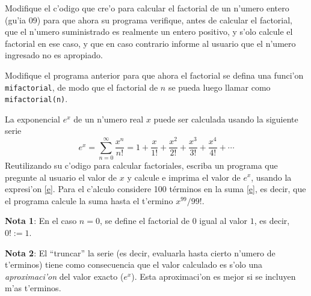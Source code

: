 \documentclass[11pt]{exam}
\begin{document}
\firstpageheadrule
\runningheadrule
{}
\cfoot{ }
\begin{flushleft}
\vspace{0.2in}

\vspace{0.25cm}
\end{flushleft}

\begin{questions}
 
\item Modifique el c'odigo que cre'o para calcular el factorial de un n'umero entero (gu'ia 09) para que ahora su programa verifique, antes de calcular el factorial, que el n'umero suministrado es realmente un entero positivo, y s'olo calcule el factorial en ese caso, y que en caso contrario informe al usuario que el n'umero ingresado no es apropiado.

\item Modifique el programa anterior para que ahora el factorial se defina una funci'on \texttt{mifactorial}, de modo que el factorial de $n$ se pueda luego llamar como \texttt{mifactorial(n)}.

\item La exponencial $e^x$ de un n'umero real $x$ puede ser calculada usando la siguiente serie
\begin{equation}\label{e}
e^x = \sum_{n=0}^\infty \frac{x^n}{n!}=1 + \frac{x}{1!} + \frac{x^2}{2!} + \frac{x^3}{3!} + \frac{x^4}{4!} + \cdots
\end{equation}
Reutilizando su c'odigo para calcular factoriales, escriba un programa que pregunte al usuario el valor de $x$ y calcule e imprima el valor de $e^x$, usando la expresi'on \eqref{e}. Para el c'alculo considere 100 términos en la suma \eqref{e}, es decir, que el programa calcule la suma hasta el t'ermino $x^{99}/{99!}$. 

\textbf{Nota 1}: En el caso $n=0$, se define el factorial de $0$ igual al valor $1$, es decir, $0! :=1$.

\textbf{Nota 2}: El ``truncar'' la serie (es decir, evaluarla hasta cierto n'umero de t'erminos) tiene como consecuencia que el valor calculado es s'olo una \textit{aproximaci'on} del valor exacto ($e^x$). Esta aproximaci'on es mejor si se incluyen m'as t'erminos.


\end{questions}
\end{document}
